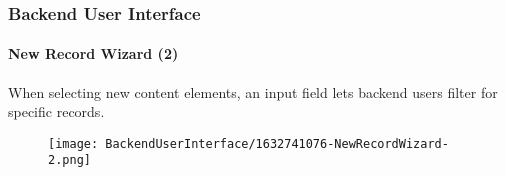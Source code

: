 %


\begin{frame}[fragile]
	\frametitle{Backend User Interface}
	\framesubtitle{New Record Wizard (2)}

	When selecting new content elements, an input field lets backend users filter
	for specific records.

	\begin{figure}
		\texttt{[image: BackendUserInterface/1632741076-NewRecordWizard-2.png]}
	\end{figure}

\end{frame}

